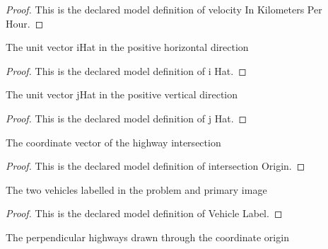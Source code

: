 \begin{proof}
  This is the declared model definition of velocity In Kilometers Per Hour.
\end{proof}
\begin{definition}[i Hat]
  \label{def:physics:phyx-mini-0748:phyxminiproblems-problemphyxmini0748-ihat}
  The unit vector iHat in the positive horizontal direction
\end{definition}
\begin{proof}
  This is the declared model definition of i Hat.
\end{proof}
\begin{definition}[j Hat]
  \label{def:physics:phyx-mini-0748:phyxminiproblems-problemphyxmini0748-jhat}
  The unit vector jHat in the positive vertical direction
\end{definition}
\begin{proof}
  This is the declared model definition of j Hat.
\end{proof}
\begin{definition}
  \label{def:physics:phyx-mini-0748:phyxminiproblems-problemphyxmini0748-intersectionorigin}
  The coordinate vector of the highway intersection
\end{definition}
\begin{proof}
  This is the declared model definition of intersection Origin.
\end{proof}
\begin{definition}
  \label{def:physics:phyx-mini-0748:phyxminiproblems-problemphyxmini0748-vehiclelabel}
  The two vehicles labelled in the problem and primary image
\end{definition}
\begin{proof}
  This is the declared model definition of Vehicle Label.
\end{proof}
\begin{definition}
  \label{def:physics:phyx-mini-0748:phyxminiproblems-problemphyxmini0748-highwaylabel}
  The perpendicular highways drawn through the coordinate origin
\end{definition}
